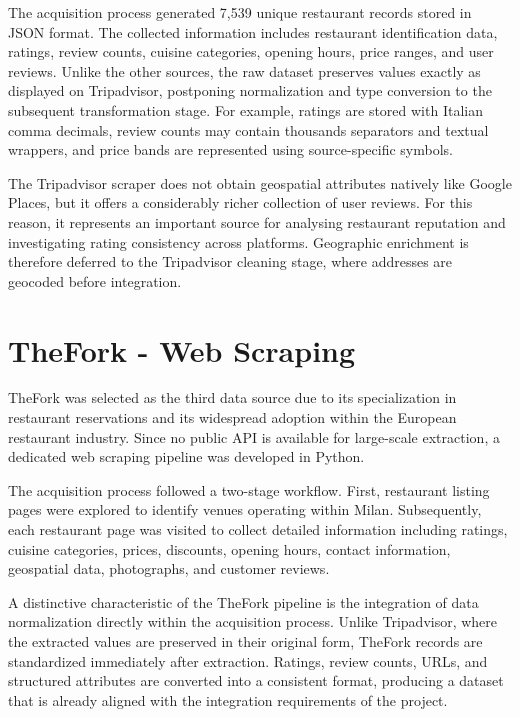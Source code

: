 The acquisition process generated 7,539 unique restaurant records stored in JSON format. The collected information includes restaurant identification data, ratings, review counts, cuisine categories, opening hours, price ranges, and user reviews. Unlike the other sources, the raw dataset preserves values exactly as displayed on Tripadvisor, postponing normalization and type conversion to the subsequent transformation stage. For example, ratings are stored with Italian comma decimals, review counts may contain thousands separators and textual wrappers, and price bands are represented using source-specific symbols.

The Tripadvisor scraper does not obtain geospatial attributes natively like Google Places, but it offers a considerably richer collection of user reviews. For this reason, it represents an important source for analysing restaurant reputation and investigating rating consistency across platforms. Geographic enrichment is therefore deferred to the Tripadvisor cleaning stage, where addresses are geocoded before integration.


\section{TheFork - Web Scraping}

TheFork was selected as the third data source due to its specialization in restaurant reservations and its widespread adoption within the European restaurant industry. Since no public API is available for large-scale extraction, a dedicated web scraping pipeline was developed in Python.

The acquisition process followed a two-stage workflow. First, restaurant listing pages were explored to identify venues operating within Milan. Subsequently, each restaurant page was visited to collect detailed information including ratings, cuisine categories, prices, discounts, opening hours, contact information, geospatial data, photographs, and customer reviews.

A distinctive characteristic of the TheFork pipeline is the integration of data normalization directly within the acquisition process. Unlike Tripadvisor, where the extracted values are preserved in their original form, TheFork records are standardized immediately after extraction. Ratings, review counts, URLs, and structured attributes are converted into a consistent format, producing a dataset that is already aligned with the integration requirements of the project.

